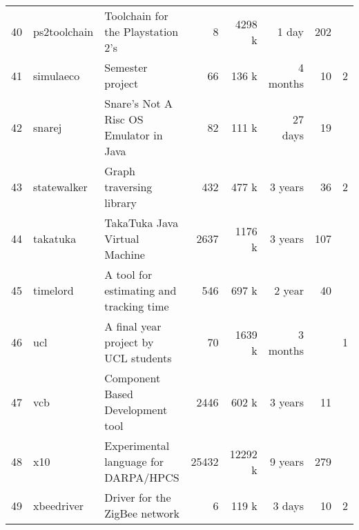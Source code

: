 \begin{table*}[htb]
\begin{tabularx}{\textwidth}{|r|l|X|r|r|r|r|r|}
  40 & ps2toolchain & Toolchain for the Playstation 2's   &   8 & 4298 k &  1 day & 202 & \\ 
  41 & simulaeco & Semester project  &  66 & 136 k &  4 months  &  10 & 2 \\ 
  42 & snarej & Snare's Not A Risc OS Emulator in Java  &  82 & 111 k &  27 days &  19 & \\ 
  43 & statewalker & Graph traversing library   & 432 & 477 k & 3 years &  36 & 2 \\ 
  44 & takatuka & TakaTuka Java Virtual Machine   & 2637 & 1176 k & 3 years & 107 & \\ 
  45 & timelord & A tool for estimating and tracking time   & 546 & 697 k &  2 year &  40 & \\ 
  46 & ucl & A final year project by UCL students &  70 & 1639 k &  3 months & & 1 \\ 
  47 & vcb & Component Based Development tool   & 2446 & 602 k & 3 years &  11 & \\ 
  48 & x10 & Experimental language for DARPA/HPCS   & 25432 & 12292 k & 9 years & 279 & \\ 
  49 & xbeedriver & Driver for the ZigBee network  &   6 & 119 k &  3 days &  10 & 2\\ 
  \hline
\end{tabularx}
\end{table*}
